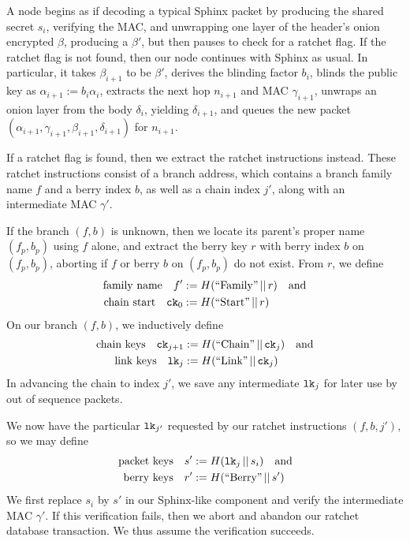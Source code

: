 \documentclass[twoside,letterpaper]{llncs}
\def\mathperiod{.}
\def\mathcomma{}
\def\mathperiod{}
\begin{document}
A node begins as if decoding a typical Sphinx packet by
 producing the shared secret $s_i$, verifying the MAC, and 
 unwrapping one layer of the header's onion encrypted $\beta$,
producing a $\beta'$,
but then pauses to check for a ratchet flag. 
If the ratchet flag is not found, then our node continues with Sphinx as usual.
In particular, it takes $\beta_{i+1}$ to be $\beta'$,
derives the blinding factor $b_i$,
blinds the public key as $\alpha_{i+1} := b_i \alpha_i$,
extracts the next hop $n_{i+1}$ and MAC $\gamma_{i+1}$,
unwraps an onion layer from the body $\delta_i$,
 yielding $\delta_{i+1}$, and queues the new packet
$(\alpha_{i+1},\gamma_{i+1},\beta_{i+1},\delta_{i+1})$ for $n_{i+1}$.

If a ratchet flag is found, then we extract the ratchet instructions instead.
These ratchet instructions consist of a branch address,
which contains a branch family name $f$ and a berry index $b$,
 as well as a chain index $j'$,
along with an intermediate MAC $\gamma'$.

If the branch $(f,b)$ is unknown, then we locate its parent's
proper name $(f_p,b_p)$ using $f$ alone, and extract the berry
key $r$ with berry index $b$ on $(f_p,b_p)$,
 aborting if $f$ or berry $b$ on $(f_p,b_p)$ do not exist.
From $r$, we define
\[ \begin{aligned}
\textrm{family name}\quad
 f' &:= H(\textrm{``Family''} \,||\, r) \quad\textrm{and} \\ %
\textrm{chain start}\quad
 \ck_0 &:= H(\textrm{``Start''} \,||\, r) \mathperiod \\
\end{aligned} \]
On our branch $(f,b)$, we inductively define 
\[ \begin{aligned}
\textrm{chain keys}\quad
 \ck_{j+1} &:= H(\textrm{``Chain''} \,||\, \ck_j) \quad\textrm{and} \\ %
\textrm{link keys}\quad
 \lk_j &:= H(\textrm{``Link''} \,||\, \ck_j) \mathperiod \\
\end{aligned} \]
In advancing the chain to index $j'$, we save any 
intermediate $\texttt{lk}_j$ for later use by out of sequence packets.

We now have the particular $\texttt{lk}_{j'}$ requested by our ratchet 
instructions $(f,b,j')$, so we may define 
\[ \begin{aligned}
\textrm{packet keys}\quad 
 s' &:= H(\lk_j \,||\, s_i) \quad\textrm{and} \\ %
\textrm{berry keys}\quad 
 r' &:= H(\textrm{``Berry''} \,||\, s') \mathperiod \\
\end{aligned} \]
We first replace $s_i$ by $s'$ in our Sphinx-like component
and verify the intermediate MAC $\gamma'$.  If this verification
fails, then we abort and abandon our ratchet database transaction.
We thus assume the verification succeeds.  
\end{document}
